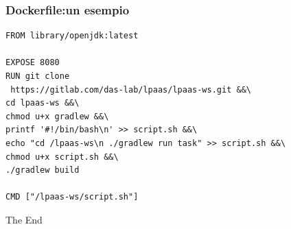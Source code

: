 \documentclass{beamer}
\begin{document}
\begin{frame}[fragile] %
\frametitle{Dockerfile:un esempio}
\begin{verbatim}
FROM library/openjdk:latest

EXPOSE 8080
RUN git clone 
 https://gitlab.com/das-lab/lpaas/lpaas-ws.git &&\
cd lpaas-ws &&\
chmod u+x gradlew &&\
printf '#!/bin/bash\n' >> script.sh &&\
echo "cd /lpaas-ws\n ./gradlew run task" >> script.sh &&\
chmod u+x script.sh &&\
./gradlew build

CMD ["/lpaas-ws/script.sh"]
\end{verbatim}
\end{frame}



\begin{frame}
\Huge{\centerline{The End}}
\end{frame}

\end{document}
